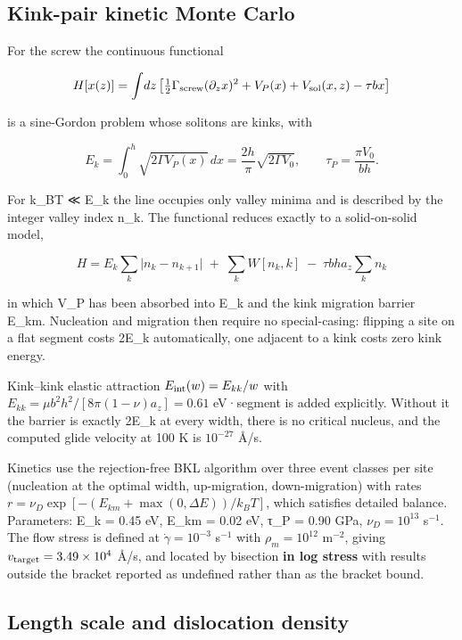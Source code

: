 \documentclass[11pt,a4paper]{article}
\begin{document}
\hypertarget{kink-pair-kinetic-monte-carlo}{%
\subsection{Kink-pair kinetic Monte Carlo}\label{sec:kink-pair-kinetic-monte-carlo}}

For the screw the continuous functional

\[H[x(z)] = \int\!dz\left[\tfrac12\Gamma_{\rm screw}(\partial_z x)^2 + V_P(x) + V_{\rm sol}(x,z) - \tau b x\right]\]

is a sine-Gordon problem whose solitons are kinks, with

\[E_k = \int_0^h\!\sqrt{2\Gamma V_P(x)}\,dx = \frac{2h}{\pi}\sqrt{2\Gamma V_0},\qquad \tau_P = \frac{\pi V_0}{bh}.\]

For k\_BT ≪ E\_k the line occupies only valley minima and is described by the integer valley index n\_k. The functional reduces exactly to a solid-on-solid model,

\[\boxed{\;H = E_k\sum_k\bigl|n_k - n_{k+1}\bigr| \;+\; \sum_k W[n_k,k] \;-\; \tau b h a_z\sum_k n_k\;}\]

in which V\_P has been absorbed into E\_k and the kink migration barrier E\_km. Nucleation and migration then require no special-casing: flipping a site on a flat segment costs 2E\_k automatically, one adjacent to a kink costs zero kink energy.

Kink--kink elastic attraction \(E_{\rm int}(w) = E_{kk}/w\) with \(E_{kk} = \mu b^2h^2/[8\pi(1-\nu)a_z] = 0.61\) eV·segment is added explicitly. Without it the barrier is exactly 2E\_k at every width, there is no critical nucleus, and the computed glide velocity at 100 K is \(10^{-27}\) \AA/s.

Kinetics use the rejection-free BKL algorithm \cite{bortz1975} over three event classes per site (nucleation at the optimal width, up-migration, down-migration) with rates \(r = \nu_D\exp[-(E_{km} + \max(0,\Delta E))/k_BT]\), which satisfies detailed balance. Parameters: E\_k = 0.45 eV, E\_km = 0.02 eV, τ\_P = 0.90 GPa, \(\nu_D = 10^{13}\) s\(^{-1}\). The flow stress is defined at \(\dot\gamma = 10^{-3}\) s\(^{-1}\) with \(\rho_m = 10^{12}\) m\(^{-2}\), giving \(v_{\rm target} = 3.49\times10^4\) \AA/s, and located by bisection \textbf{in log stress} with results outside the bracket reported as undefined rather than as the bracket bound.

\hypertarget{length-scale-and-dislocation-density}{%
\subsection{Length scale and dislocation density}\label{sec:length-scale-and-dislocation-density}}
\end{document}
